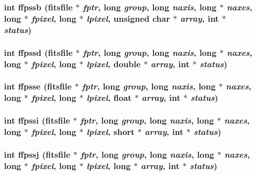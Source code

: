 \subsubsection{\setlength{\rightskip}{0pt plus 5cm}int ffpssb (\bf{fitsfile} $\ast$ {\em fptr}, long {\em group}, long {\em naxis}, long $\ast$ {\em naxes}, long $\ast$ {\em fpixel}, long $\ast$ {\em lpixel}, unsigned char $\ast$ {\em array}, int $\ast$ {\em status})}\label{fitsio_8h_3c03b253046fc85ef6be13e34ac3d8b2}


\subsubsection{\setlength{\rightskip}{0pt plus 5cm}int ffpssd (\bf{fitsfile} $\ast$ {\em fptr}, long {\em group}, long {\em naxis}, long $\ast$ {\em naxes}, long $\ast$ {\em fpixel}, long $\ast$ {\em lpixel}, double $\ast$ {\em array}, int $\ast$ {\em status})}\label{fitsio_8h_005342a1cc091d589dbc8dbfdc577e32}


\subsubsection{\setlength{\rightskip}{0pt plus 5cm}int ffpsse (\bf{fitsfile} $\ast$ {\em fptr}, long {\em group}, long {\em naxis}, long $\ast$ {\em naxes}, long $\ast$ {\em fpixel}, long $\ast$ {\em lpixel}, float $\ast$ {\em array}, int $\ast$ {\em status})}\label{fitsio_8h_622b3a307ccbbbba93b0cf910a9c4091}


\subsubsection{\setlength{\rightskip}{0pt plus 5cm}int ffpssi (\bf{fitsfile} $\ast$ {\em fptr}, long {\em group}, long {\em naxis}, long $\ast$ {\em naxes}, long $\ast$ {\em fpixel}, long $\ast$ {\em lpixel}, short $\ast$ {\em array}, int $\ast$ {\em status})}\label{fitsio_8h_2cf8bd9e8aec6e36d824b4fd9b34b9e0}


\subsubsection{\setlength{\rightskip}{0pt plus 5cm}int ffpssj (\bf{fitsfile} $\ast$ {\em fptr}, long {\em group}, long {\em naxis}, long $\ast$ {\em naxes}, long $\ast$ {\em fpixel}, long $\ast$ {\em lpixel}, long $\ast$ {\em array}, int $\ast$ {\em status})}\label{fitsio_8h_ed68d2a2c51c19b9579ca7db53e148c5}


